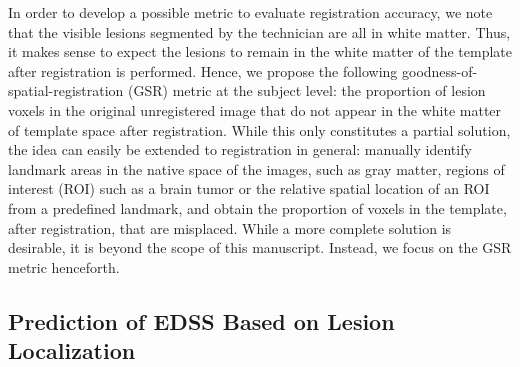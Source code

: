 \documentclass[10pt]{article}
\begin{document}
In order to develop a possible metric to evaluate registration accuracy, we note that the visible lesions segmented by the technician are all in white matter. Thus, it makes sense to expect the lesions to remain in the white matter of the template after registration is performed.
Hence, we propose the following goodness-of-spatial-registration (GSR) metric at the subject level: the proportion of lesion voxels in the original unregistered image that
do not appear in the white matter of template space after registration. While this only constitutes a partial solution, the idea can easily be extended to registration in general: manually identify landmark areas in the native space of the images, such as gray matter, regions of interest (ROI) such as a brain tumor or the relative spatial location of an ROI from a predefined landmark, and obtain the proportion of voxels in the template, after registration, that are misplaced. While a more complete solution is desirable, it is beyond the scope of this manuscript. Instead, we focus on the GSR metric henceforth.


\subsection*{Prediction of EDSS Based on Lesion Localization}
\end{document}
